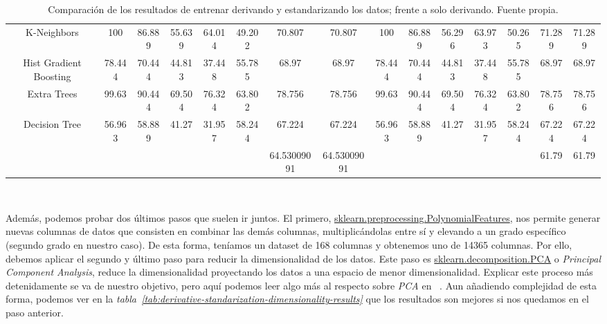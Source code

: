 \begin{table}[!h]
{\begin{tabular}{|c|ccccccc|ccccccc|}
        K-Neighbors & 100 & 86.889 & 55.639 & 64.014 & 49.202 & 70.807 & 70.807 & 100 & 86.889 & 56.296 & 63.973 & 50.265 & 71.289 & 71.289 \\
        Hist Gradient Boosting & 78.444 & 70.444 & 44.813 & 37.448 & 55.785 & 68.97 & 68.97 & 78.444 & 70.444 & 44.813 & 37.448 & 55.785 & 68.97 & 68.97 \\
        Extra Trees & 99.63 & 90.444 & 69.504 & 76.324 & 63.802 & 78.756 & 78.756 & 99.63 & 90.444 & 69.504 & 76.324 & 63.802 & 78.756 & 78.756 \\
        Decision Tree & 56.963 & 58.889 & 41.27 & 31.957 & 58.244 & 67.224 & 67.224 & 56.963 & 58.889 & 41.27 & 31.957 & 58.244 & 67.224 & 67.224 \\ \hline
        & & & & & & 64.53009091 & 64.53009091 & & & & & & 61.79 & 61.79 \\ \hline
        \end{tabular}}
    \caption{Comparación de los resultados de entrenar derivando y estandarizando los datos; frente a solo derivando. Fuente propia.}\ \label{tab:derivative-standarization-results}
\end{table}


Además, podemos probar dos últimos pasos que suelen ir juntos. El primero, \href{https://scikit-learn.org/stable/modules/generated/sklearn.preprocessing.PolynomialFeatures.html}{sklearn.preprocessing.PolynomialFeatures}, 
nos permite generar nuevas columnas de datos que consisten en combinar las demás columnas, multiplicándolas entre sí y elevando a un grado específico (segundo grado en nuestro caso). 
De esta forma, teníamos un \gls{dataset} de 168 columnas y obtenemos uno de 14365 columnas. Por ello, debemos aplicar el segundo y último paso para reducir la dimensionalidad
de los datos. Este paso es \href{https://scikit-learn.org/stable/modules/generated/sklearn.decomposition.PCA.html}{sklearn.decomposition.PCA} o \textit{Principal Component Analysis},
reduce la dimensionalidad proyectando los datos a una espacio de menor dimensionalidad. Explicar este proceso más detenidamente se va de nuestro objetivo, pero
aquí podemos leer algo más al respecto sobre \textit{PCA} en \ \cite{Principa62:online}.
Aun añadiendo complejidad de esta forma, podemos ver en la \textit{tabla\ \ref{tab:derivative-standarization-dimensionality-results}} que los resultados son mejores si
nos quedamos en el paso anterior.

